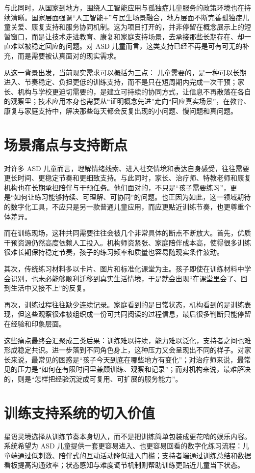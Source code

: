 与此同时，从国家到地方，围绕人工智能应用与孤独症儿童服务的政策环境也在持续清晰。国家层面强调“人工智能+”与民生场景融合，地方层面不断完善孤独症儿童关爱、康复支持和服务协同机制。这为项目打开的，并非停留在概念展示上的短暂窗口，而是让技术走进教育、康复和家庭支持场景，去承接那些长期存在、却一直难以被稳定回应的问题。对 ASD 儿童而言，这类支持已经不再是可有可无的补充，而是需要被认真面对的现实需求。

从这一背景出发，当前现实需求可以概括为三点：
儿童需要的，是一种可以长期进入、节奏稳定、负担更低的训练支持，而不是只在短周期内完成一次干预；家长、机构与学校更迫切需要的，是建立可持续的协同方式，让信息不再散落在各自的观察里；技术应用本身也需要从“证明概念先进”走向“回应真实场景”，在教育、康复与家庭支持中，解决那些每天都会反复出现的小问题、慢问题和真问题。

\section{场景痛点与支持断点}
对许多 ASD 儿童而言，理解情绪线索、进入社交情境和表达自身感受，往往需要更长时间、更稳定节奏和更细致支持。与此同时，家长、治疗师、特教老师和康复机构也在长期承担陪伴与干预任务。他们面对的，不只是“孩子需要练习”，更是“如何让练习能够持续、可理解、可协同”的问题。也正因为如此，这一领域期待的数字化工具，不应只是另一款普通儿童应用，而应更贴近训练节奏，也更尊重个体差异。

而在训练现场，这种共同需要往往会被几个非常具体的断点不断放大。首先，优质干预资源仍然高度依赖人工投入。机构师资紧张、家庭陪伴成本高，使得很多训练很难长期保持稳定节奏，孩子的练习频率和质量也容易随现实条件波动。

其次，传统练习材料多以卡片、图片和标准化课堂为主。孩子即使在训练材料中学会识别，也未必能够顺利迁移到真实生活情境，于是就会出现“在课堂里会了、回到生活中又接不上”的反复。

再次，训练过程往往缺少连续记录。家庭看到的是日常状态，机构看到的是训练表现，但这些观察很难被组织成一份可共同阅读的过程信息，最后很多判断只能停留在经验和印象层面。


这些痛点最终会汇聚成三类后果：训练难以持续，能力难以泛化，支持者之间也难形成稳定共识。进一步落到不同角色身上，这种压力又会呈现出不同的样子。对家长来说，最常见的困惑是“孩子今天到底在哪些地方有变化”；对治疗师来说，最常见的压力是“如何在有限时间里兼顾训练、观察和记录”；而对机构来说，最难解决的，则是“怎样把经验沉淀成可复用、可扩展的服务能力”。

\section{训练支持系统的切入价值}
星语灵境选择从训练节奏本身切入，而不是把训练简单包装成更花哨的娱乐内容。系统希望为 ASD 儿童提供一套更容易进入、也更容易回看的数字化练习流程：儿童端通过低刺激、陪伴式的互动活动降低进入门槛；支持者端通过训练总结和数据看板提高沟通效率；状态感知与难度调节机制则帮助训练更贴近儿童当下状态。

